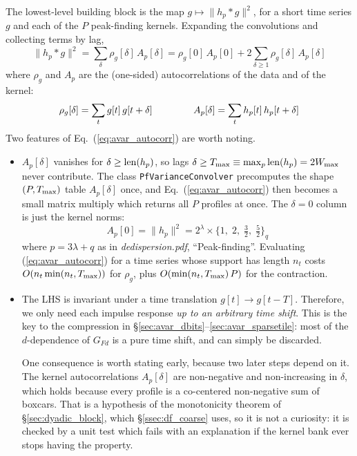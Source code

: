 \documentclass{article}
\numberwithin{equation}{section}   %
\newcommand{\ddnotes}[1]{{\em dedispersion.pdf}, ``#1''}
\begin{document}
The lowest-level building block is the map $g \mapsto \|h_p * g\|^2$, for a short time series $g$
and each of the $P$ peak-finding kernels. Expanding the convolutions and collecting terms by lag,
\begin{equation}
\big\| h_p * g \big\|^2 = \sum_{\delta} \rho_g[\delta] \, A_p[\delta]
  = \rho_g[0] \, A_p[0] + 2 \sum_{\delta \ge 1} \rho_g[\delta] \, A_p[\delta]
  \label{eq:avar_autocorr}
\end{equation}
where $\rho_g$ and $A_p$ are the (one-sided) autocorrelations of the data and of the kernel:
\begin{equation}
\rho_g[\delta] = \sum_t g[t] \, g[t+\delta]
  \hspace{1.5cm}
A_p[\delta] = \sum_t h_p[t] \, h_p[t+\delta]
\end{equation}
Two features of Eq.\ (\ref{eq:avar_autocorr}) are worth noting.
\begin{itemize}
\item $A_p[\delta]$ vanishes for $\delta \ge {\rm len}(h_p)$, so lags
$\delta \ge T_{\rm max} \equiv \max_p {\rm len}(h_p) = 2 W_{\rm max}$ never contribute.
The class \verb|PfVarianceConvolver| precomputes the shape $(P,T_{\rm max})$ table $A_p[\delta]$
once, and Eq.\ (\ref{eq:avar_autocorr}) then becomes a small matrix multiply which returns all $P$
profiles at once. The $\delta=0$ column is just the kernel norms:
\begin{equation}
A_p[0] = \|h_p\|^2 = 2^\lambda \times \big\{ 1, \; 2, \; \tfrac{3}{2}, \; \tfrac{5}{2} \big\}_q
\end{equation}
where $p = 3\lambda + q$ as in \ddnotes{Peak-finding}.
Evaluating (\ref{eq:avar_autocorr}) for a time series whose support has length $n_t$ costs
$O(n_t \min(n_t, T_{\rm max}))$ for $\rho_g$, plus $O(\min(n_t,T_{\rm max}) \, P)$ for the
contraction.

\item The LHS is invariant under a time translation $g[t] \rightarrow g[t-T]$. Therefore, we only
need each impulse response {\em up to an arbitrary time shift}. This is the key to the
compression in \S\ref{sec:avar_dbits}--\ref{sec:avar_sparsetile}: most of the $d$-dependence of
$G_{Fd}$ is a pure time shift, and can simply be discarded.

One consequence is worth stating early, because two later steps depend on it. The kernel
autocorrelations $A_p[\delta]$ are non-negative and non-increasing in $\delta$, which holds
because every profile is a co-centered non-negative sum of boxcars. That is a hypothesis of the
monotonicity theorem of \S\ref{sec:dyadic_block}, which \S\ref{ssec:df_coarse} uses, so it is
not a curiosity: it is checked by a unit test which fails with an explanation if the kernel bank
ever stops having the property.
\end{itemize}
\end{document}
